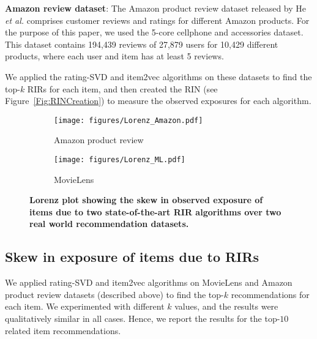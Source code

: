 \vspace{1 mm}
\noindent
\textbf{Amazon review dataset}: The Amazon product review dataset released by He \textit{et al.} \cite{he2016ups} comprises customer reviews and ratings for different Amazon products. For the purpose of this paper, we used the 5-core cellphone and accessories dataset. This dataset contains 194,439 reviews of 27,879 users for 10,429 different products, where each user and item has at least 5 reviews.

\vspace{1 mm}
\noindent
We applied the rating-SVD and item2vec algorithms on %
these datasets to find the top-$k$ RIRs for each item, and then created the RIN (see Figure~\ref{Fig:RINCreation}) 
to measure the observed exposures for each algorithm. 


\begin{figure}[tb]
	\centering
	\begin{subfigure}{0.43\columnwidth}
		\centering
		\texttt{[image: figures/Lorenz\_Amazon.pdf]}
		\caption{Amazon product review}
		\label{fig: AmazonExp}
	\end{subfigure}%
	\begin{subfigure}{0.43\columnwidth}
		\centering
		\texttt{[image: figures/Lorenz\_ML.pdf]}
		\caption{MovieLens }%
		\label{fig: MLExp}
	\end{subfigure}
	
	\vspace*{-2mm}
	\caption{{\bf Lorenz plot showing the skew in observed exposure of items due to two state-of-the-art RIR algorithms over two real world recommendation datasets. 
	}}
	\label{fig: Lorenz}
	\vspace*{-5mm}
\end{figure}


\subsection{Skew in exposure of items due to RIRs}
\label{sub:existing-rir-bias}
We applied rating-SVD and item2vec algorithms on MovieLens and Amazon product review datasets (described above) to find the top-$k$ recommendations for each item. We experimented with different $k$ values, and the results were qualitatively similar in all cases. Hence, we report the results for the top-$10$ related item recommendations.

